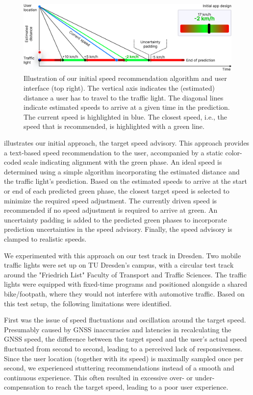 \begin{figure}[!b]
\centering
\includegraphics[width=\linewidth]{images/graph-based-speed-recommendation.png}
\caption{Illustration of our initial speed recommendation algorithm and user interface (top right). The vertical axis indicates the (estimated) distance a user has to travel to the traffic light. The diagonal lines indicate estimated speeds to arrive at a given time in the prediction. The current speed is highlighted in blue. The closest speed, i.e., the speed that is recommended, is highlighted with a green line.}
\label{fig:graph-based-speed-recommendation}
\end{figure}

 illustrates our initial approach, the target speed advisory. This approach provides a text-based speed recommendation to the user, accompanied by a static color-coded scale indicating alignment with the green phase. An ideal speed is determined using a simple algorithm incorporating the estimated distance and the traffic light's prediction. Based on the estimated speeds to arrive at the start or end of each predicted green phase, the closest target speed is selected to minimize the required speed adjustment. The currently driven speed is recommended if no speed adjustment is required to arrive at green. An uncertainty padding is added to the predicted green phases to incorporate prediction uncertainties in the speed advisory. Finally, the speed advisory is clamped to realistic speeds.

We experimented with this approach on our test track in Dresden. Two mobile traffic lights were set up on TU Dresden's campus, with a circular test track around the "Friedrich List" Faculty of Transport and Traffic Sciences. The traffic lights were equipped with fixed-time programs and positioned alongside a shared bike/footpath, where they would not interfere with automotive traffic. Based on this test setup, the following limitations were identified.

First was the issue of speed fluctuations and oscillation around the target speed. Presumably caused by GNSS inaccuracies and latencies in recalculating the GNSS speed, the difference between the target speed and the user's actual speed fluctuated from second to second, leading to a perceived lack of responsiveness. Since the user location (together with its speed) is maximally sampled once per second, we experienced stuttering recommendations instead of a smooth and continuous experience. This often resulted in excessive over- or under-compensation to reach the target speed, leading to a poor user experience.

